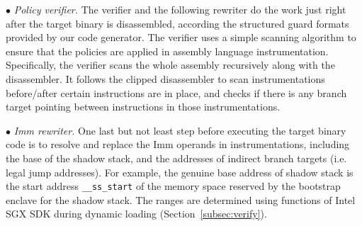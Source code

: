 \vspace{2pt}\noindent$\bullet$\textit{ Policy verifier.}\label{subsec-policyverifer}
The verifier and the following rewriter do the work just right after the target binary is disassembled, according the structured guard formats provided by our code generator. The verifier uses a simple scanning algorithm to ensure that the policies are applied in assembly language instrumentation. 
Specifically, the verifier scans the whole assembly recursively along with the disassembler. It follows the clipped disassembler to scan instrumentations before/after certain instructions are in place, and checks if there is any branch target pointing between instructions in those instrumentations.

\vspace{2pt}\noindent$\bullet$\textit{ Imm rewriter.}\label{subsec:immrewriter} One last but not least step before executing the target binary code is to resolve and replace the Imm operands in instrumentations, including the base of the shadow stack, and the addresses of indirect branch targets (i.e. legal jump addresses). For example, the genuine base address of shadow stack is the start address \verb|__ss_start| of the memory space reserved by the bootstrap enclave for the shadow stack. The ranges are determined using functions of Intel SGX SDK during dynamic loading (Section~\ref{subsec:verify}).

